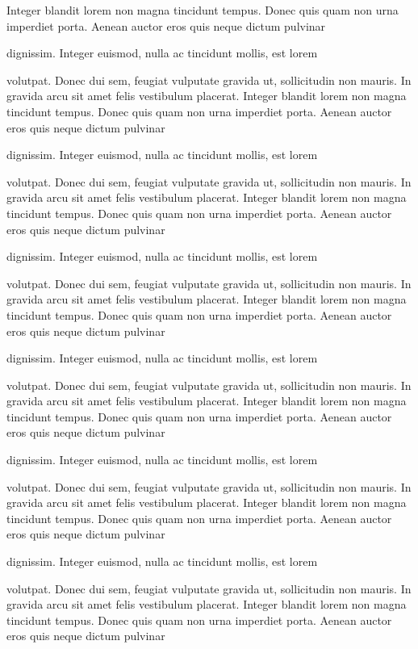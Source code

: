 {\startrule\obeylines\raggedright\parindent=0pt %
Integer blandit lorem non magna tincidunt tempus. Donec quis quam non
urna imperdiet porta. Aenean auctor eros quis neque dictum pulvinar

dignissim. Integer euismod, nulla ac tincidunt mollis, est lorem

volutpat. Donec dui sem, feugiat vulputate gravida ut, sollicitudin
non mauris. In gravida arcu sit amet felis vestibulum placerat.
Integer blandit lorem non magna tincidunt tempus. Donec quis quam non
urna imperdiet porta. Aenean auctor eros quis neque dictum pulvinar

dignissim. Integer euismod, nulla ac tincidunt mollis, est lorem

volutpat. Donec dui sem, feugiat vulputate gravida ut, sollicitudin
non mauris. In gravida arcu sit amet felis vestibulum placerat.
Integer blandit lorem non magna tincidunt tempus. Donec quis quam non
urna imperdiet porta. Aenean auctor eros quis neque dictum pulvinar

dignissim. Integer euismod, nulla ac tincidunt mollis, est lorem

volutpat. Donec dui sem, feugiat vulputate gravida ut, sollicitudin
non mauris. In gravida arcu sit amet felis vestibulum placerat.
Integer blandit lorem non magna tincidunt tempus. Donec quis quam non
urna imperdiet porta. Aenean auctor eros quis neque dictum pulvinar

dignissim. Integer euismod, nulla ac tincidunt mollis, est lorem

volutpat. Donec dui sem, feugiat vulputate gravida ut, sollicitudin
non mauris. In gravida arcu sit amet felis vestibulum placerat.
Integer blandit lorem non magna tincidunt tempus. Donec quis quam non
urna imperdiet porta. Aenean auctor eros quis neque dictum pulvinar

dignissim. Integer euismod, nulla ac tincidunt mollis, est lorem

volutpat. Donec dui sem, feugiat vulputate gravida ut, sollicitudin
non mauris. In gravida arcu sit amet felis vestibulum placerat.
Integer blandit lorem non magna tincidunt tempus. Donec quis quam non
urna imperdiet porta. Aenean auctor eros quis neque dictum pulvinar

dignissim. Integer euismod, nulla ac tincidunt mollis, est lorem

volutpat. Donec dui sem, feugiat vulputate gravida ut, sollicitudin
non mauris. In gravida arcu sit amet felis vestibulum placerat.
Integer blandit lorem non magna tincidunt tempus. Donec quis quam non
urna imperdiet porta. Aenean auctor eros quis neque dictum pulvinar

}
